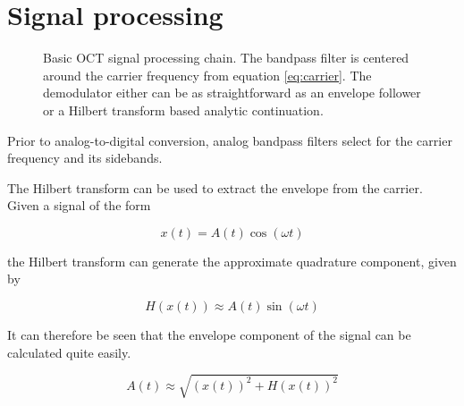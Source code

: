 \section{Signal processing}


\begin{figure}[h!]
  \centering
{}
\caption[Basic OCT signal processing chain.]{Basic OCT signal processing chain. The bandpass filter is centered around the carrier frequency from equation \ref{eq:carrier}. The demodulator either can be as straightforward as an envelope follower or a Hilbert transform based analytic continuation.}
\end{figure}

Prior to analog-to-digital conversion, analog bandpass filters select for the carrier frequency and its sidebands.

The Hilbert transform can be used to extract the envelope from the carrier. Given a signal of the form

\begin{equation}
x(t) = A(t)\cos{(\omega t)}
\end{equation}

the Hilbert transform can generate the approximate quadrature component, given by

\begin{equation}
H(x(t)) \approx A(t) \sin{(\omega t)}
\end{equation}

It can therefore be seen that the envelope component of the signal can be calculated quite easily. \cite{oppenheim}

\begin{equation}
A(t) \approx \sqrt{(x(t))^2 + H(x(t))^2}
\end{equation}

